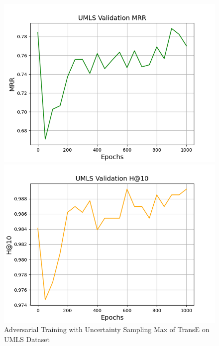 \begin{figure}
\begin{minipage}{.5\textwidth}
      \includegraphics[width=0.9\linewidth]{figures/results/UMLS/AdversarialTraining/Uncertainty/Max/gan_train_umls_mrr.png}
    \end{minipage}%
    \begin{minipage}{.5\textwidth}
      \centering
      \includegraphics[width=0.9\linewidth]{figures/results/UMLS/AdversarialTraining/Uncertainty/Max/gan_train_umls_hit10.png}
    \end{minipage}%
    \caption{Adversarial Training with Uncertainty Sampling Max of TransE on UMLS Dataset}
    \label{fig:test}
\end{figure}


\pagebreak


